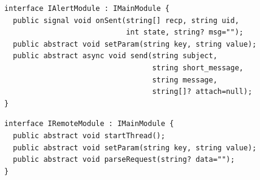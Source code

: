 \begin{figure}[H]
 \lstset{language=[ISO]C++}
 \begin{lstlisting}[label=alg:praxis-basis-ialertmodule,caption={[Interface: IAlertModule]Das Interface eines Alert-Modules ist sehr einfach und besitzt eigentlich nur eine Methode um einen Alert zu senden, ein Signal f\"ur die \"Ubermittlungsbest\"atigung und eine Methode zur Konfiguration des Modules.}]
interface IAlertModule : IMainModule {
  public signal void onSent(string[] recp, string uid,
                            int state, string? msg="");
  public abstract void setParam(string key, string value);
  public abstract async void send(string subject,
                                  string short_message,
                                  string message,
                                  string[]? attach=null);
}
 \end{lstlisting}
\end{figure}

\begin{figure}[H]
 \lstset{language=[ISO]C++}
 \begin{lstlisting}[label=alg:praxis-basis-iremotemodule,caption={[Interface: IRemoteModule]Ein Remote-API Modul muss lediglich bei der Instanzierung konfiguriert werden. Anschliessend wird \"uber die Methode \texttt{startThread()} ein eigener Thread gestartet, welcher die komplette Kommunikation mit den Clients \"ubernimmt. Der Konformit\"at zuliebe wurde die Methode \texttt{parseRequest(string? data="`"')} dennoch in das Interface aufgenommen.}]
interface IRemoteModule : IMainModule {
  public abstract void startThread();
  public abstract void setParam(string key, string value);
  public abstract void parseRequest(string? data="");
}
 \end{lstlisting}
\end{figure}


